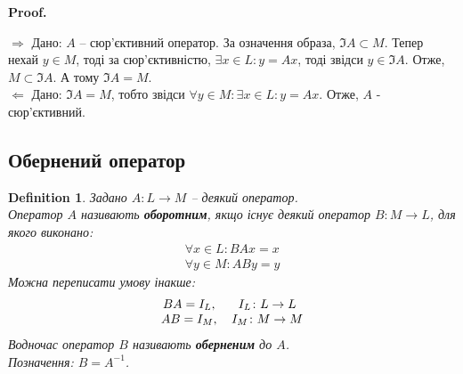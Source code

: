 \documentclass[a4paper, 10pt]{article}
\makeatletter
\def\rightproof{$\boxed{\Rightarrow}$ }
\def\leftproof{$\boxed{\Leftarrow}$ }
\theoremstyle{theoremdd}
\newtheorem{definition}[theorem]{Definition}
\renewenvironment{proof}[1][Proof.\\]{\par
\pushQED{\hfill \qed}%
\normalfont \topsep6\p@\@plus6\p@\relax
\trivlist
\item\relax
{\bfseries
#1\@addpunct{.}}\hspace\labelsep\ignorespaces
}{%
\popQED\endtrivlist\@endpefalse
}
\makeatother
\begin{document}
	\begin{proof}
	\rightproof Дано: $A$ -- сюр'єктивний оператор. За означення образа, $\Im A \subset M$. Тепер нехай $y \in M$, тоді за сюр'єктивністю, $\exists x \in L: y = Ax$, тоді звідси $y \in \Im A$. Отже, $M \subset \Im A$. А тому $\Im A = M$.
	\bigskip \\
	\leftproof Дано: $\Im A = M$, тобто звідси $\forall y \in M: \exists x \in L: y = Ax$. Отже, $A$ - сюр'єктивний.
	\end{proof}
	
	\subsection{Обернений оператор}
	\begin{definition}
	Задано $A \colon L \to M$ -- деякий оператор.\\
	Оператор $A$ називають \textbf{оборотним}, якщо існує деякий оператор $B \colon M \to L$, для якого виконано:
	\begin{align*}
	\forall x \in L: BAx = x \\
	\forall y \in M: ABy = y
	\end{align*}
	Можна переписати умову інакше:
	\begin{align*}
	\begin{tabular}{cc}
	$BA = I_L$, & $I_L \colon L \to L$ \\
	$AB = I_M$, & $I_M \colon M \to M$
	\end{tabular}
	\end{align*}
	Водночас оператор $B$ називають \textbf{оберненим} до $A$.\\
	Позначення: $B = A^{-1}$.
	\end{definition}
	
\end{document}
